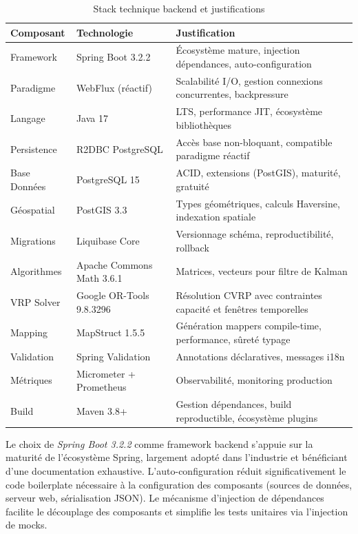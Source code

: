 \begin{table}[h]
\centering
\caption{Stack technique backend et justifications}
\label{tab:stack_backend}
\begin{tabular}{|l|l|p{6cm}|}
\hline
\textbf{Composant} & \textbf{Technologie} & \textbf{Justification} \\
\hline
Framework & Spring Boot 3.2.2 & Écosystème mature, injection dépendances, auto-configuration \\
\hline
Paradigme & WebFlux (réactif) & Scalabilité I/O, gestion connexions concurrentes, backpressure \\
\hline
Langage & Java 17 & LTS, performance JIT, écosystème bibliothèques \\
\hline
Persistence & R2DBC PostgreSQL & Accès base non-bloquant, compatible paradigme réactif \\
\hline
Base Données & PostgreSQL 15 & ACID, extensions (PostGIS), maturité, gratuité \\
\hline
Géospatial & PostGIS 3.3 & Types géométriques, calculs Haversine, indexation spatiale \\
\hline
Migrations & Liquibase Core & Versionnage schéma, reproductibilité, rollback \\
\hline
Algorithmes & Apache Commons Math 3.6.1 & Matrices, vecteurs pour filtre de Kalman \\
\hline
VRP Solver & Google OR-Tools 9.8.3296 & Résolution CVRP avec contraintes capacité et fenêtres temporelles \\
\hline
Mapping & MapStruct 1.5.5 & Génération mappers compile-time, performance, sûreté typage \\
\hline
Validation & Spring Validation & Annotations déclaratives, messages i18n \\
\hline
Métriques & Micrometer + Prometheus & Observabilité, monitoring production \\
\hline
Build & Maven 3.8+ & Gestion dépendances, build reproductible, écosystème plugins \\
\hline
\end{tabular}
\end{table}

Le choix de \textit{Spring Boot 3.2.2} comme framework backend s'appuie sur la maturité de l'écosystème Spring, largement adopté dans l'industrie et bénéficiant d'une documentation exhaustive. L'auto-configuration réduit significativement le code boilerplate nécessaire à la configuration des composants (sources de données, serveur web, sérialisation JSON). Le mécanisme d'injection de dépendances facilite le découplage des composants et simplifie les tests unitaires via l'injection de mocks.

